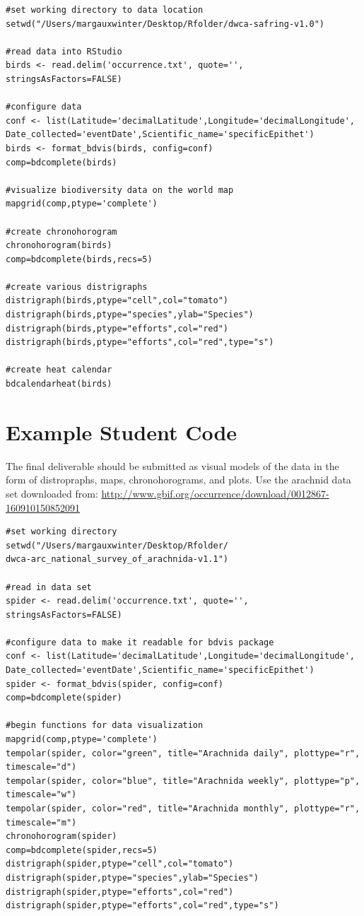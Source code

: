 \begin{lstlisting}
#set working directory to data location
setwd("/Users/margauxwinter/Desktop/Rfolder/dwca-safring-v1.0")

#read data into RStudio
birds <- read.delim('occurrence.txt', quote='', stringsAsFactors=FALSE)

#configure data
conf <- list(Latitude='decimalLatitude',Longitude='decimalLongitude',
Date_collected='eventDate',Scientific_name='specificEpithet')
birds <- format_bdvis(birds, config=conf)
comp=bdcomplete(birds)

#visualize biodiversity data on the world map
mapgrid(comp,ptype='complete')

#create chronohorogram
chronohorogram(birds) 
comp=bdcomplete(birds,recs=5)

#create various distrigraphs
distrigraph(birds,ptype="cell",col="tomato") 
distrigraph(birds,ptype="species",ylab="Species") 
distrigraph(birds,ptype="efforts",col="red") 
distrigraph(birds,ptype="efforts",col="red",type="s") 

#create heat calendar
bdcalendarheat(birds) 
\end{lstlisting}

\section{Example Student Code}

The final deliverable should be submitted as visual models of the data in the form of distropraphs, maps, chronohorograms, and plots.
Use the arachnid data set downloaded from: \url{http://www.gbif.org/occurrence/download/0012867-160910150852091}

\begin{lstlisting}
#set working directory
setwd("/Users/margauxwinter/Desktop/Rfolder/
dwca-arc_national_survey_of_arachnida-v1.1")

#read in data set
spider <- read.delim('occurrence.txt', quote='', stringsAsFactors=FALSE)

#configure data to make it readable for bdvis package
conf <- list(Latitude='decimalLatitude',Longitude='decimalLongitude',
Date_collected='eventDate',Scientific_name='specificEpithet')
spider <- format_bdvis(spider, config=conf)
comp=bdcomplete(spider)

#begin functions for data visualization
mapgrid(comp,ptype='complete')
tempolar(spider, color="green", title="Arachnida daily", plottype="r", timescale="d") 
tempolar(spider, color="blue", title="Arachnida weekly", plottype="p", timescale="w") 
tempolar(spider, color="red", title="Arachnida monthly", plottype="r", timescale="m") 
chronohorogram(spider) 
comp=bdcomplete(spider,recs=5)
distrigraph(spider,ptype="cell",col="tomato") 
distrigraph(spider,ptype="species",ylab="Species") 
distrigraph(spider,ptype="efforts",col="red") 
distrigraph(spider,ptype="efforts",col="red",type="s") 
\end{lstlisting}

